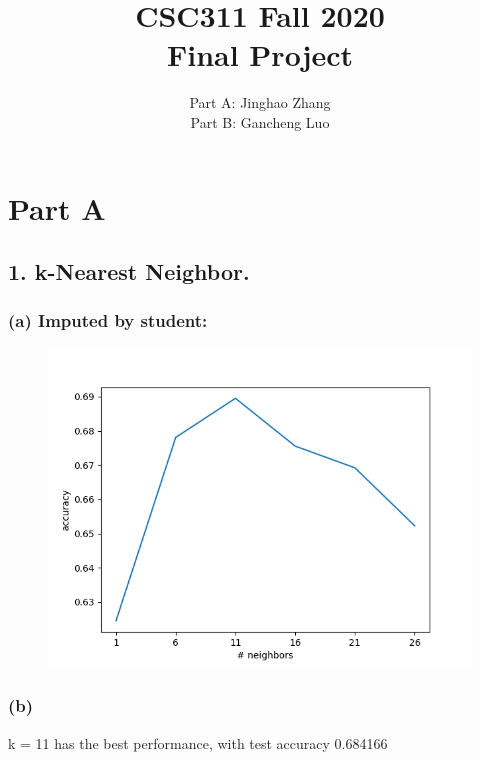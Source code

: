 \documentclass{article}
\title{CSC311 Fall 2020\\
	Final Project}
\author{Part A: Jinghao Zhang\\
Part B: Gancheng Luo}
\begin{document}
\maketitle
\newpage

\section*{Part A}
\subsection*{1. k-Nearest Neighbor.}
\subsubsection*{(a) Imputed by student:}
\vspace*{0cm}
\begin{figure}[htbp]
	\centering
	\includegraphics[scale=0.5]{knn_impute_by_student.png}
\end{figure}
\subsubsection*{(b)}
k = 11 has the best performance, with test accuracy 0.684166
\end{document}
